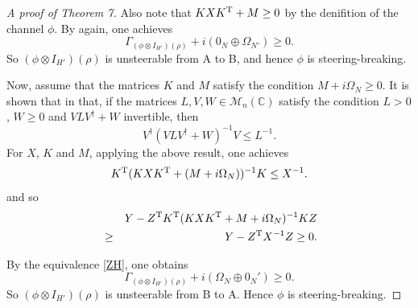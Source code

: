 \documentclass[10pt,aps,pra,amsfonts,amssymb,amsmath,%
floatfix,nofootinbib, groupedaddress,superscriptaddress,citesort,twocolumn
]{revtex4}%
\begin{document}
\begin{proof}[A proof of Theorem 7]
	Also note that $KX{K^{\rm T}} + M \ge 0
	$
	by the denifition of the channel $\phi$.
	By \cite{ZH} again,  one achieves 
	$${\Gamma _{\left( {\phi  \otimes  I_{H'}} \right)(\rho )}} + i(0_N \oplus {\Omega _{N'}})\ge 0.$$ So  $ (\phi  \otimes { I_{H'}})\left( \rho  \right)$
	is unsteerable from A to B,  and hence  $\phi$	is steering-breaking.
	
 Now, assume that the matrices  $ K$ and $M $ satisfy the condition $M+i\Omega_N \ge 0$.  
It is shown that in \cite{LHQ} that, if the matrices $ L,V,W \in \mathcal M_n(\mathbb C)$ satisfy the condition  $L> 0$, $W\geq 0$ and   $VLV^{\dag}+W$  invertible, then  $$V^{\dag}(VLV^{\dag}+W)^{-1}V \le L^{-1}.$$ For $X$, $K$ and $M$, applying the above result, one achieves 
 $${K^{\rm T}}(KX{K^{\rm T}} + (M+i{\Omega _{N}}))^{-1}K\le X^{-1}.$$  and so
		\begin{eqnarray*}
		&& Y-{Z^{\rm T}}{K^{\rm T}}(KX{K^{\rm T}} + M+i{\Omega _{N}})^{-1}KZ \\
		&\ge & Y-{Z^{\rm T}}X^{ - 1}{Z} \ge0.
	\end{eqnarray*}

By the equivalence \eqref{ZH},  one obtains
$${\Gamma _{\left( {\phi  \otimes  I_{H'}} \right)(\rho )}} + i({\Omega _{N}} \oplus 0_N')\ge 0.$$ So  $ (\phi  \otimes { I_{H'}})\left( \rho  \right)$
is unsteerable from B to A. Hence  $\phi$	is steering-breaking.
\end{proof}	
\end{document}
